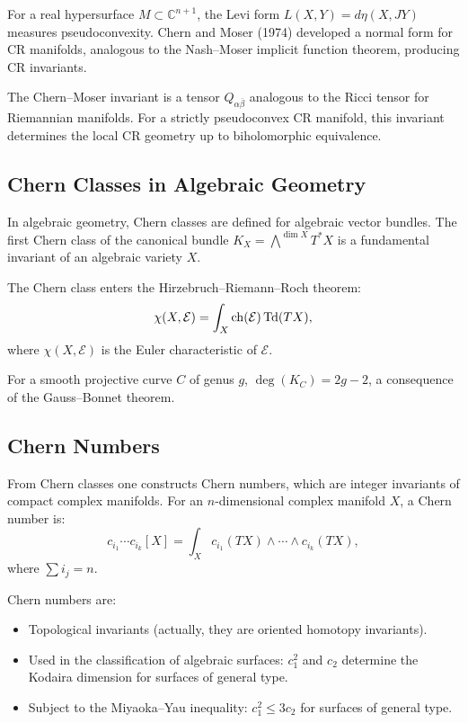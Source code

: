 For a real hypersurface $M \subset \mathbb{C}^{n+1}$, the Levi form $L(X, Y) = d\eta(X, JY)$ measures pseudoconvexity. Chern and Moser (1974) developed a normal form for CR manifolds, analogous to the Nash--Moser implicit function theorem, producing CR invariants.

The Chern--Moser invariant is a tensor $Q_{\alpha \overline{\beta}}$ analogous to the Ricci tensor for Riemannian manifolds. For a strictly pseudoconvex CR manifold, this invariant determines the local CR geometry up to biholomorphic equivalence.

\subsection{Chern Classes in Algebraic Geometry}

In algebraic geometry, Chern classes are defined for algebraic vector bundles. The first Chern class of the canonical bundle $K_X = \bigwedge^{\dim X} T^*X$ is a fundamental invariant of an algebraic variety $X$.

The Chern class enters the Hirzebruch--Riemann--Roch theorem:
\[
\chi(X, \mathcal{E}) = \int_X \operatorname{ch}(\mathcal{E}) \operatorname{Td}(TX),
\]
where $\chi(X, \mathcal{E})$ is the Euler characteristic of $\mathcal{E}$.

For a smooth projective curve $C$ of genus $g$, $\deg(K_C) = 2g - 2$, a consequence of the Gauss--Bonnet theorem.

\subsection{Chern Numbers}

From Chern classes one constructs Chern numbers, which are integer invariants of compact complex manifolds. For an $n$-dimensional complex manifold $X$, a Chern number is:
\[
c_{i_1} \cdots c_{i_k}[X] = \int_X c_{i_1}(TX) \wedge \cdots \wedge c_{i_k}(TX),
\]
where $\sum i_j = n$.

Chern numbers are:
\begin{itemize}
    \item Topological invariants (actually, they are oriented homotopy invariants).
    \item Used in the classification of algebraic surfaces: $c_1^2$ and $c_2$ determine the Kodaira dimension for surfaces of general type.
    \item Subject to the Miyaoka--Yau inequality: $c_1^2 \leq 3c_2$ for surfaces of general type.
\end{itemize}

